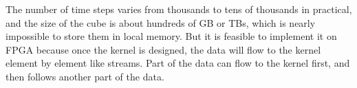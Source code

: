 The number of time steps
varies from thousands to tens of thousands in practical, and the size of
the cube is about hundreds of GB or TBs, which is nearly impossible to
store them in local memory. But it is feasible to implement it on FPGA
because once the kernel is designed, the data will flow to the kernel
element by element like streams. Part of the data can flow to the kernel
first, and then follows another part of the data.

